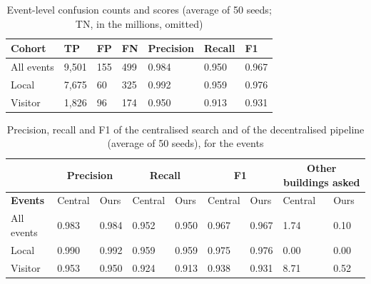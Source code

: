 \documentclass[12pt,a4paper,oneside]{report}
\begin{document}
\begin{table}[htbp]
\centering
\caption{Event-level confusion counts and scores (average of 50 seeds; TN, in the millions, omitted)}\label{tab:events}
{\small\setlength{\tabcolsep}{4pt}\renewcommand{\arraystretch}{1.2}
\begin{tabular}{|p{2.97cm}|p{1.78cm}|p{1.48cm}|p{1.48cm}|p{1.98cm}|p{1.78cm}|p{1.58cm}|}\hline
\textbf{Cohort} & \textbf{TP} & \textbf{FP} & \textbf{FN} & \textbf{Precision} & \textbf{Recall} & \textbf{F1}\\\hline
All events & 9,501 & 155 & 499 & 0.984 & 0.950 & 0.967\\\hline
Local & 7,675 & 60 & 325 & 0.992 & 0.959 & 0.976\\\hline
Visitor & 1,826 & 96 & 174 & 0.950 & 0.913 & 0.931\\\hline
\end{tabular}}
\end{table}

\begin{table}[htbp]
\centering
\caption{Precision, recall and F1 of the centralised search and of the decentralised pipeline (average of 50 seeds), for the events}\label{tab:censcores}
{\small\setlength{\tabcolsep}{3pt}\renewcommand{\arraystretch}{1.2}
\begin{tabular}{|p{3.0cm}|p{1.2cm}|p{1.2cm}|p{1.2cm}|p{1.2cm}|p{1.2cm}|p{1.2cm}|p{1.2cm}|p{1.2cm}|}\hline
 & \multicolumn{2}{c|}{\textbf{Precision}} & \multicolumn{2}{c|}{\textbf{Recall}} & \multicolumn{2}{c|}{\textbf{F1}} & \multicolumn{2}{c|}{\textbf{Other buildings asked}}\\\hline
\textbf{Events} & Central & Ours & Central & Ours & Central & Ours & Central & Ours\\\hline
All events & 0.983 & 0.984 & 0.952 & 0.950 & 0.967 & 0.967 & 1.74 & 0.10\\\hline
Local & 0.990 & 0.992 & 0.959 & 0.959 & 0.975 & 0.976 & 0.00 & 0.00\\\hline
Visitor & 0.953 & 0.950 & 0.924 & 0.913 & 0.938 & 0.931 & 8.71 & 0.52\\\hline
\end{tabular}}
\end{table}
\end{document}
